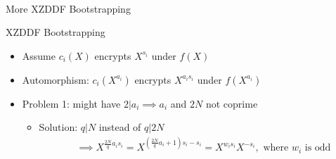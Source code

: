 \documentclass[aspectratio=169]{beamer}
\begin{document}
\begin{frame}{\\~\\~\\~\\~\\~\\~\\~\\ \huge \text{\;\;\;\;} More XZDDF Bootstrapping}
\end{frame}

\begin{frame}{XZDDF Bootstrapping}
    \begin{itemize}
        \item Assume $c_i(X) $ encrypts $X^{s_i}$ under $f(X) $
    \end{itemize}

    \begin{itemize}
        \item Automorphism: \; $c_i(X^{a_i})$ encrypts $X^{a_i s_i}$ under $f(X^{a_i}) $
    \end{itemize}


    \begin{itemize}
        \item Problem 1: might have $2|a_i \implies a_i$ and $2N$ not coprime %
        \begin{itemize}
            \item Solution: $q|N$ instead of $q|2N $%
            \begin{align*}
                & \implies X^{\frac{2N}{q}a_is_i} = X^{(\frac{2N}{q}a_i+1)s_i-s_i} = X^{w_is_i}X^{-s_i}, \text{ where $w_i$ is odd} %
            \end{align*}
        \end{itemize}
    \end{itemize}


\end{frame}
\end{document}
